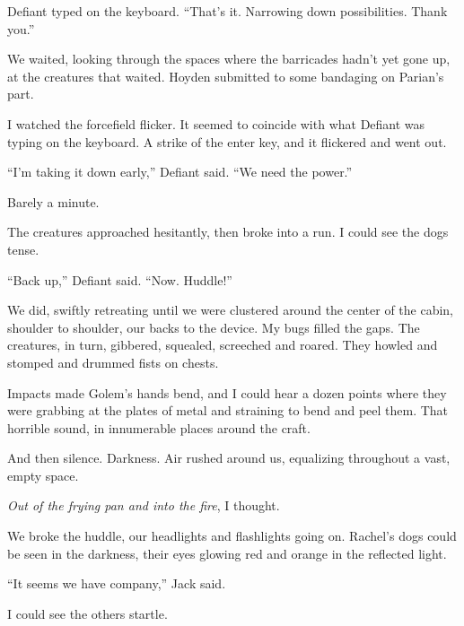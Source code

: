 Defiant typed on the keyboard.  ``That's it.  Narrowing down possibilities.  Thank you.''



We waited, looking through the spaces where the barricades hadn't yet gone up, at the creatures that waited.  Hoyden submitted to some bandaging on Parian's part.



I watched the forcefield flicker.  It seemed to coincide with what Defiant was typing on the keyboard.  A strike of the enter key, and it flickered and went out.



``I'm taking it down early,'' Defiant said.  ``We need the power.''



Barely a minute.



The creatures approached hesitantly, then broke into a run.  I could see the dogs tense.



``Back up,'' Defiant said.  ``Now.  Huddle!''



We did, swiftly retreating until we were clustered around the center of the cabin, shoulder to shoulder, our backs to the device. My bugs filled the gaps.  The creatures, in turn, gibbered, squealed, screeched and roared.  They howled and stomped and drummed fists on chests.



Impacts made Golem's hands bend, and I could hear a dozen points where they were grabbing at the plates of metal and straining to bend and peel them.  That horrible sound, in innumerable places around the craft.



And then silence.  Darkness.  Air rushed around us, equalizing throughout a vast, empty space.



\emph{Out of the frying pan and into the fire}, I thought.



We broke the huddle, our headlights and flashlights going on.  Rachel's dogs could be seen in the darkness, their eyes glowing red and orange in the reflected light.



``It seems we have company,'' Jack said.



I could see the others startle.



